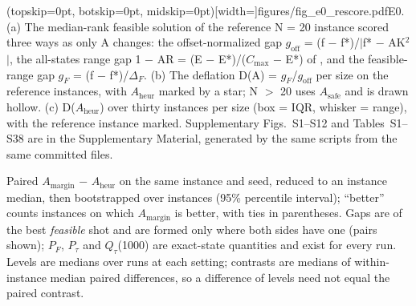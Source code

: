\documentclass{ieeeaccess}
\begin{document}
\Figure[!t](topskip=0pt, botskip=0pt, midskip=0pt)[width=\textwidth]{figures/fig_e0_rescore.pdf}{E0. (a) The median-rank feasible solution of   the reference N = 20 instance scored three ways as only A changes: the offset-normalized gap   $g_{\mathrm{off}}$ = (f $-$ f*)/$|$f* $-$ AK$^{2}$$|$, the all-states range gap 1 $-$ AR = (E $-$ E*)/($C_{\mathrm{max}}$ $-$ E*) of \cite{ref19},   and the feasible-range gap $g_{F}$ = (f $-$ f*)/$\Delta_{F}$. (b) The deflation D(A) = $g_{F}$/$g_{\mathrm{off}}$ per size on   the reference instances, with $A_{\mathrm{heur}}$ marked by a star; N $>$ 20 uses $A_{\mathrm{safe}}$ and is drawn hollow.   (c) D($A_{\mathrm{heur}}$) over thirty instances per size (box = IQR, whisker = range), with the reference   instance marked.  Supplementary Figs.~S1--S12 and Tables~S1--S38 are in the Supplementary Material, generated by the same scripts from the same committed files.\label{fig:3}}



Paired $A_{\mathrm{margin}}$ $-$ $A_{\mathrm{heur}}$ on the same instance and seed, reduced to an instance median, then bootstrapped over instances (95\% percentile interval); ``better'' counts instances on which $A_{\mathrm{margin}}$ is better, with ties in parentheses. Gaps are of the best \textit{feasible} shot and are formed only where both sides have one (pairs shown); $P_{F}$, $P_{\tau}$ and $Q_{\tau}$(1000) are exact-state quantities and exist for every run. Levels are medians over runs at each setting; contrasts are medians of within-instance median paired differences, so a difference of levels need not equal the paired contrast.
\end{document}
